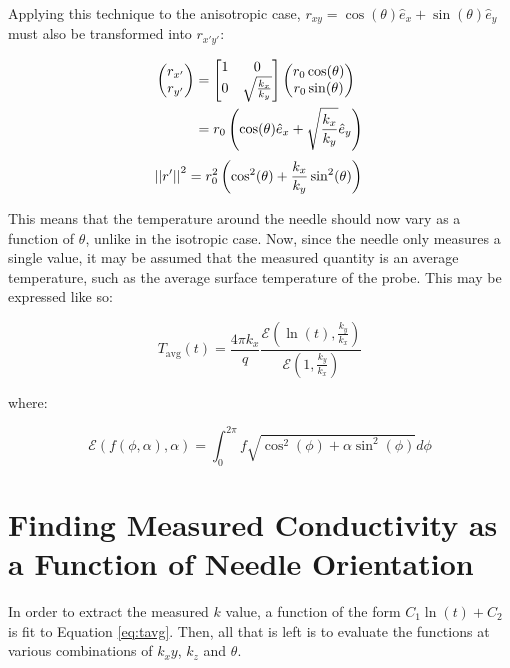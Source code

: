 Applying this technique to the anisotropic case, \(r_{xy} = \cos(\theta) \hat{e}_x + \sin(\theta) \hat{e}_y \) must also be transformed
into \(r_{x'y'}\):

\begin{align*}
    \begin{pmatrix}r_{x'} \\ r_{y'}\end{pmatrix} &=
    \begin{bmatrix}1 & 0\\ 0 & \sqrt{\frac{k_x}{k_y}} \end{bmatrix}\begin{pmatrix}r_0\cos(\theta) \\ r_0\sin(\theta)\end{pmatrix}\\
    &= r_0\left(\cos(\theta) \hat{e}_x + \sqrt{\frac{k_x}{k_y}} \hat{e}_y \right)\\
\end{align*}
\begin{equation}
    \left|\left|{r'}\right|\right|^2 = r_0^2 \left(\cos^2(\theta) + \frac{k_x}{k_y}\sin^2(\theta) \right)\\
\end{equation}

This means that the temperature around the needle should now vary as a function
of \(\theta\), unlike in the isotropic case. Now, since the needle only measures
a single value, it may be assumed that the measured quantity is an
average temperature, such as the average surface temperature of the probe.  This
may be expressed like so:

\begin{equation}
\label{eq:tavg}
T_{\textrm{avg}}(t) = \frac{4\pi k_x}{q} \frac{\mathcal{E}(\ln(t), \frac{k_y}{k_x})}{\mathcal{E}(1, \frac{k_y}{k_x})}
\end{equation}

where:

\begin{equation}
\mathcal{E}(f(\phi, \alpha), \alpha) = \int_0^{2\pi} f\sqrt{\cos^2(\phi) + \alpha\sin^2(\phi)} d\phi
\end{equation}

\section{Finding Measured Conductivity as a Function of Needle Orientation}

In order to extract the measured \(k\) value, a function of the form
\(C_1 \ln(t) + C_2\) is fit to Equation \ref{eq:tavg}. Then, all that is left is to evaluate the functions at various combinations of
\(k_xy\), \(k_z\) and \(\theta\).

